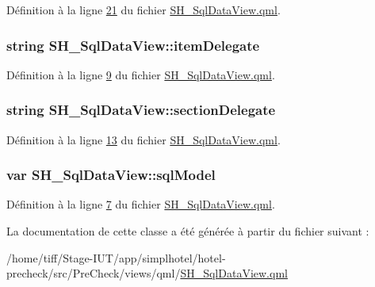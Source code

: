 Définition à la ligne \hyperlink{SH__SqlDataView_8qml_source_l00021}{21} du fichier \hyperlink{SH__SqlDataView_8qml_source}{S\-H\-\_\-\-Sql\-Data\-View.\-qml}.

\hypertarget{classSH__SqlDataView_a7ae6767ae8a82bd33b942c774c534a33}{
\subsubsection[{item\-Delegate}]{\setlength{\rightskip}{0pt plus 5cm}string S\-H\-\_\-\-Sql\-Data\-View\-::item\-Delegate}}\label{classSH__SqlDataView_a7ae6767ae8a82bd33b942c774c534a33}


Définition à la ligne \hyperlink{SH__SqlDataView_8qml_source_l00009}{9} du fichier \hyperlink{SH__SqlDataView_8qml_source}{S\-H\-\_\-\-Sql\-Data\-View.\-qml}.

\hypertarget{classSH__SqlDataView_a60486947b034f5fca72a2d5775ad1767}{
\subsubsection[{section\-Delegate}]{\setlength{\rightskip}{0pt plus 5cm}string S\-H\-\_\-\-Sql\-Data\-View\-::section\-Delegate}}\label{classSH__SqlDataView_a60486947b034f5fca72a2d5775ad1767}


Définition à la ligne \hyperlink{SH__SqlDataView_8qml_source_l00013}{13} du fichier \hyperlink{SH__SqlDataView_8qml_source}{S\-H\-\_\-\-Sql\-Data\-View.\-qml}.

\hypertarget{classSH__SqlDataView_ad538d6f1dd43a7d01c7960a74ca131dc}{
\subsubsection[{sql\-Model}]{\setlength{\rightskip}{0pt plus 5cm}var S\-H\-\_\-\-Sql\-Data\-View\-::sql\-Model}}\label{classSH__SqlDataView_ad538d6f1dd43a7d01c7960a74ca131dc}


Définition à la ligne \hyperlink{SH__SqlDataView_8qml_source_l00007}{7} du fichier \hyperlink{SH__SqlDataView_8qml_source}{S\-H\-\_\-\-Sql\-Data\-View.\-qml}.



La documentation de cette classe a été générée à partir du fichier suivant \-:\begin{DoxyCompactItemize}
\item 
/home/tiff/\-Stage-\/\-I\-U\-T/app/simplhotel/hotel-\/precheck/src/\-Pre\-Check/views/qml/\hyperlink{SH__SqlDataView_8qml}{S\-H\-\_\-\-Sql\-Data\-View.\-qml}\end{DoxyCompactItemize}
